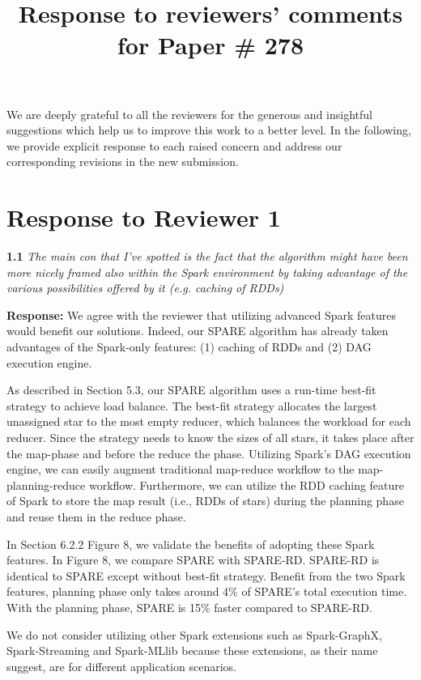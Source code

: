 \documentclass{vldb}
\begin{document}
\title{Response to reviewers' comments for Paper \# 278}
\maketitle

We are deeply grateful to all the reviewers for the generous and insightful
suggestions which help us to improve this work to a better level.
In the following, we provide explicit response to each raised concern and address our corresponding revisions in the new submission.

\section{Response to Reviewer 1}

\textbf{1.1} \emph{The main con that I've spotted is the fact that the algorithm might have been
more nicely framed also within the Spark environment by taking advantage of
the various possibilities offered by it (e.g. caching of RDDs)}


\textbf{Response:} We agree with the reviewer that utilizing advanced Spark features
would benefit our solutions. Indeed, our SPARE algorithm has already taken advantages of the Spark-only features: (1) caching of RDDs and (2) DAG execution engine. 

As described in Section 5.3, our SPARE algorithm uses a run-time best-fit strategy to achieve load balance. The best-fit strategy allocates the largest unassigned star to the most empty reducer, which balances the workload for each reducer. Since the strategy needs to know the sizes of all stars, it takes place after the map-phase and before the reduce the phase.
Utilizing Spark's DAG execution engine, we can easily augment traditional map-reduce workflow to the map-planning-reduce workflow. Furthermore, we can utilize the RDD caching feature of Spark to store the map result (i.e., RDDs of stars)
during the planning phase and reuse them in the reduce phase.

In Section 6.2.2 Figure 8, we validate the benefits of adopting these Spark features. In Figure 8, we compare SPARE with
SPARE-RD. SPARE-RD is identical to SPARE except without best-fit strategy. Benefit from the two Spark features, planning
phase only takes around 4\% of SPARE's total execution time. With the planning phase, SPARE is 15\% faster compared to SPARE-RD.


We do not consider utilizing other Spark extensions such as Spark-GraphX, Spark-Streaming and Spark-MLlib because these extensions, as their name suggest, are for different application scenarios.









\end{document}
